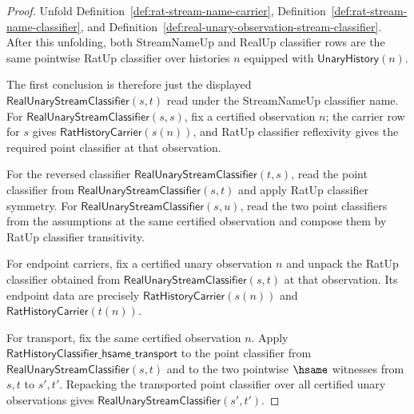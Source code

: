 \begin{proof}
Unfold Definition~\ref{def:rat-stream-name-carrier},
Definition~\ref{def:rat-stream-name-classifier}, and
Definition~\ref{def:real-unary-observation-stream-classifier}. After this
unfolding, both StreamNameUp and RealUp classifier rows are the same pointwise
RatUp classifier over histories $n$ equipped with
$\mathsf{UnaryHistory}(n)$.

The first conclusion is therefore just the displayed
$\mathsf{RealUnaryStreamClassifier}(s,t)$ read under the StreamNameUp
classifier name. For $\mathsf{RealUnaryStreamClassifier}(s,s)$, fix a
certified observation $n$; the carrier row for $s$ gives
$\mathsf{RatHistoryCarrier}(s(n))$, and RatUp classifier reflexivity gives the
required point classifier at that observation.

For the reversed classifier $\mathsf{RealUnaryStreamClassifier}(t,s)$, read the
point classifier from $\mathsf{RealUnaryStreamClassifier}(s,t)$ and apply RatUp
classifier symmetry. For $\mathsf{RealUnaryStreamClassifier}(s,u)$, read the
two point classifiers from the assumptions at the same certified observation
and compose them by RatUp classifier transitivity.

For endpoint carriers, fix a certified unary observation $n$ and unpack the
RatUp classifier obtained from $\mathsf{RealUnaryStreamClassifier}(s,t)$ at
that observation. Its endpoint data are precisely
$\mathsf{RatHistoryCarrier}(s(n))$ and $\mathsf{RatHistoryCarrier}(t(n))$.

For transport, fix the same certified observation $n$. Apply
$\mathsf{RatHistoryClassifier\_hsame\_transport}$ to the point classifier from
$\mathsf{RealUnaryStreamClassifier}(s,t)$ and to the two pointwise $\hsame$
witnesses from $s,t$ to $s',t'$. Repacking the transported point classifier
over all certified unary observations gives
$\mathsf{RealUnaryStreamClassifier}(s',t')$.
\end{proof}

